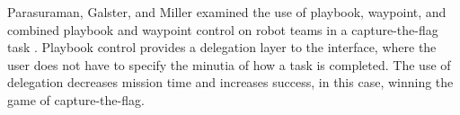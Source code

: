 Parasuraman, Galster, and Miller examined the use of playbook, waypoint, and combined playbook and waypoint control on robot teams in a capture-the-flag task \citep{parasuraman2005flexible}.
Playbook control provides a delegation layer to the interface, where the user does not have to specify the minutia of how a task is completed. 
The use of delegation decreases mission time and increases success, in this case, winning the game of capture-the-flag.

